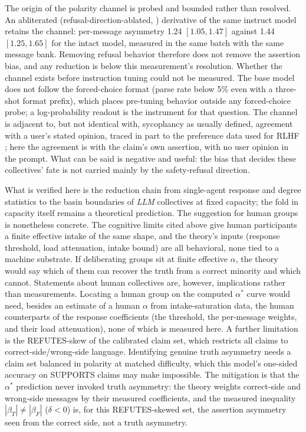 \documentclass[11pt]{article}
\newcommand{\astar}{\alpha^{*}}
\begin{document}
The origin of the polarity channel is probed and bounded rather than
resolved. An abliterated (refusal-direction-ablated, \citealp{Arditi2024})
derivative of the same instruct model retains the channel: per-message
asymmetry 1.24 $[1.05, 1.47]$ against 1.44 $[1.25, 1.65]$ for the intact
model, measured in the same batch with the same message bank. Removing
refusal behavior therefore does not remove the assertion bias, and any
reduction is below this measurement's resolution. Whether the channel
exists before instruction tuning could not be measured. The base model does
not follow the forced-choice format (parse rate below 5\% even with a
three-shot format prefix), which places pre-tuning behavior outside any
forced-choice probe; a log-probability readout is the instrument for that
question. The channel is adjacent to, but not identical with, sycophancy as
usually defined, agreement with a user's stated opinion, traced in part to
the preference data used for RLHF \citep{Sharma2023}; here the agreement is
with the claim's own assertion, with no user opinion in the prompt. What
can be said is negative and useful: the bias that decides these
collectives' fate is not carried mainly by the safety-refusal direction.

What is verified here is the reduction chain from single-agent response and
degree statistics to the basin boundaries of \emph{LLM} collectives at
fixed capacity; the fold in capacity itself remains a theoretical
prediction. The suggestion for human groups is nonetheless concrete. The
cognitive limits cited above give human participants a finite effective
intake of the same shape, and the theory's inputs (response threshold, load
attenuation, intake bound) are all behavioral, none tied to a machine
substrate. If deliberating groups sit at finite effective $\alpha$, the
theory would say which of them can recover the truth from a correct
minority and which cannot. Statements about human collectives are,
however, implications rather than measurements. Locating a human group on
the computed $\astar$ curve would need, besides an estimate of a human
$\alpha$ from intake-saturation data, the human counterparts of the
response coefficients (the threshold, the per-message weights, and their
load attenuation), none of which is measured here. A further limitation is
the REFUTES-skew of the calibrated claim set, which restricts all claims to
correct-side/wrong-side language. Identifying genuine truth asymmetry needs
a claim set balanced in polarity at matched difficulty, which this model's
one-sided accuracy on SUPPORTS claims may make impossible. The mitigation
is that the $\astar$ prediction never invoked truth asymmetry: the theory
weights correct-side and wrong-side messages by their measured
coefficients, and the measured inequality $|\beta_T| \ne |\beta_F|$
($\delta < 0$) is, for this REFUTES-skewed set, the assertion asymmetry
seen from the correct side, not a truth asymmetry.
\end{document}
